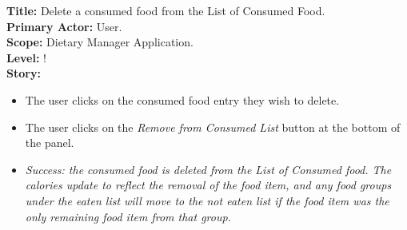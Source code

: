 \documentclass{article}
\begin{document}
\textbf{Title:} Delete a consumed food from the List of Consumed Food.
\\
\textbf{Primary Actor:} User.
\\
\textbf{Scope:} Dietary Manager Application.
\\
\textbf{Level:} !
\\
\textbf{Story:}
\begin{itemize}
    \item The user clicks on the consumed food entry they wish to delete.
    \item The user clicks on the \textit{Remove from Consumed List} button at the bottom of the panel.
    \item \em Success: \em the consumed food is deleted from the List of Consumed food. The calories update to reflect the removal of the food item, and any food groups under the eaten list will move to the not eaten list if the food item was the only remaining food item from that group.
\end{itemize}
\\\\
\end{document}
